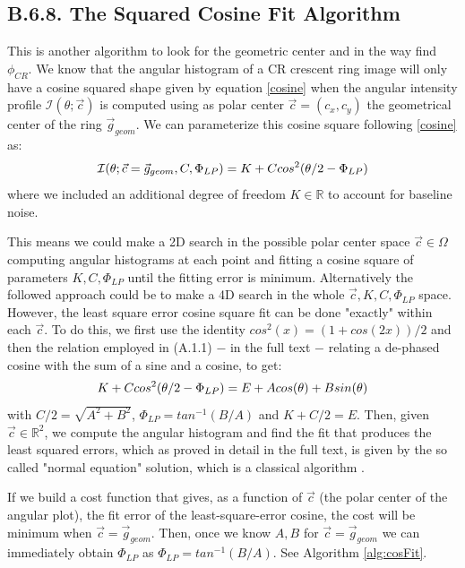 \documentclass[11pt, a4paper, twoside]{article} %
\newcommand{\R}{\mathbb{R}} %
\begin{document}
\subsection*{B.6.8. The Squared Cosine Fit Algorithm}\vspace{-0.1cm}
This is another algorithm to look for the geometric center and in the way find $\phi_{CR}$. We know that the angular histogram of a CR crescent ring image will only have a cosine squared shape given by equation \eqref{cosine} when the angular intensity profile $\mathcal{I}(\theta;\vec{c})$ is computed using as polar center $\vec{c}=(c_x,c_y)$ the geometrical center of the ring $\vec{g}_{geom}$. We can parameterize this cosine square following \eqref{cosine} as:\vspace{-0.1cm}
\begin{equation}
\mathcal{I}(\theta;\vec{c}=\vec{g}_{geom}, C,\Phi_{LP})=K+Ccos^2(\theta/2-\Phi_{LP})\vspace{-0.1cm}
\end{equation}
where we included an additional degree of freedom $K\in\R$ to account for baseline noise.

This means we could make a 2D search in the possible polar center space $\vec{c}\in\Omega$ computing angular histograms at each point and fitting a cosine square of parameters $K,C,\Phi_{LP}$ until the fitting error is minimum. Alternatively the followed approach could be to make a 4D search in the whole $\vec{c},K,C,\Phi_{LP}$ space. However, the least square error cosine square fit can be done "exactly" within each $\vec{c}$. To do this, we first use the identity $cos^2(x)=(1+cos(2x))/2$ and then the relation employed in (A.1.1) $-$ in the full text $-$ relating a de-phased cosine with the sum of a sine and a cosine, to get:
\begin{equation}
K+Ccos^2(\theta/2-\Phi_{LP})=E+Acos(\theta)+Bsin(\theta)\vspace{-0.1cm}
\end{equation}
with $C/2=\sqrt{A^2+B^2}$,  $\Phi_{LP}=tan^{-1}(B/A)$ and $K+C/2=E$. Then, given $\vec{c}\in\R^2$, we compute the angular histogram and find the fit that produces the least squared errors, which as proved in detail in the full text, is given by the so called "normal equation" solution, which is a classical algorithm \cite{leastsquares}.

If we build a cost function that gives, as a function of $\vec{c}$ (the polar center of the angular plot), the fit error of the least-square-error cosine, the cost will be minimum when $\vec{c}=\vec{g}_{geom}$. Then, once we know $A,B$ for $\vec{c}=\vec{g}_{geom}$ we can immediately obtain $\Phi_{LP}$ as $\Phi_{LP}=tan^{-1}(B/A)$. See Algorithm \ref{alg:cosFit}.
\end{document}
